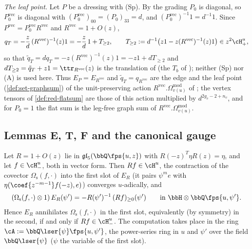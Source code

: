 \emph{The leaf point.} Let $P$ be a dressing with (Sp). By the grading $P_0$ is diagonal, so $P_0^{\mathrm{vec}}$ is diagonal with $(P_0^{\mathrm{vec}})_{00} = (P_0)_{33} = d$, and $(P_0^{\mathrm{vec}})^{-1}1 = d^{-1}1$. Since $P^{\mathrm{vec}} = P_0^{\mathrm{vec}}R^{\mathrm{vec}}$ and $R^{\mathrm{vec}} = 1+O(z)$,
\begin{equation}
\label{eq:tra-leaf}
q_T = -\frac zd\,(R^{\mathrm{vec}})^{-1}(z)1 = -\frac zd\,1+T_{\geq 2},\qquad T_{\geq 2} := d^{-1}\bigl(z1-z(R^{\mathrm{vec}})^{-1}(z)1\bigr)\in z^2\cH^u_+ ,
\end{equation}
so that $\tilde q_T = dq_T = -z(R^{\mathrm{vec}})^{-1}(z)1 = -z1+dT_{\geq 2}$ and $dT_{\geq 2} = \tilde q_T+z1 = \ttr_{R^{\mathrm{vec}}}(z)$ is the translation of \cite[Def.~2.13]{PPZ15} (the $T_b$ of \cite[Prop.~2.12]{PPZ15}); neither (Sp) nor (A) is used here. Thus $E_P = E_{R^{\mathrm{vec}}}$ and $\tilde q_T = q_{R^{\mathrm{vec}}}$ are the edge and the leaf point (\cref{def:set-graphsum}) of the unit-preserving action $R^{\mathrm{vec}}.\Omega^{\mathrm{mod}}_{v(u)}$ of \cite[Defs.~2.2, 2.13]{PPZ15}; the vertex tensors of \cref{def:red-flatsum} are those of this action multiplied by $d^{2g_v-2+n_v}$, and for $P_0 = 1$ the flat sum is the leg-free graph sum of $R^{\mathrm{vec}}.\Omega^{\mathrm{mod}}_{v(u)}$.

\subsection{Lemmas E, T, F and the canonical gauge}
\label{sec:tra-lemmas}

\begin{lem}[Lemma E]
\label{lem:tra-E}
Let $R = 1+O(z)$ lie in $\mathfrak{gl}_5(\bbQ\fps{u,z})$ with $R(-z)^T\eta R(z) = \eta$, and let $f\in\cH^u_-$, both in vector form. Then $Rf\in\cH^u$, the contraction of the covector $\Omega_{\mathrm s}(f,\cdot)$ into the first slot of $E_R$ (it pairs $\psi^me$ with $\eta(\coef{z^{-m-1}}f(-z),e)$) converges $u$-adically, and
\begin{equation}
\label{eq:tra-lemE}
(\Omega_{\mathrm s}(f,\cdot)\otimes 1)\,E_R(\psi') = -R(\psi')^{-1}\,(Rf)_{\geq 0}(\psi')\qquad\text{in }\bbH\otimes\bbQ\fps{u,\psi'} .
\end{equation}
Hence $E_R$ annihilates $\Omega_{\mathrm s}(f,\cdot)$ in the first slot, equivalently (by symmetry) in the second, if and only if $Rf\in\cH^u_-$. The computation takes place in the ring $\cA := \bbQ\lser{\psi}\fps{u,\psi'}$, the power-series ring in $u$ and $\psi'$ over the field $\bbQ\lser{\psi}$ ($\psi$ the variable of the first slot).
\end{lem}

